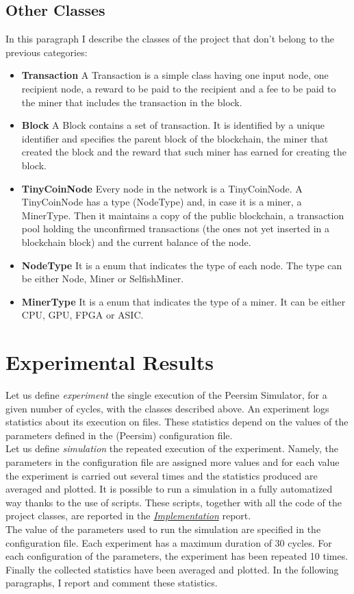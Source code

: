 \documentclass{article}
\begin{document}
\subsection{Other Classes} 
In this paragraph I describe the classes of the project that don't belong to the previous categories:
\begin{itemize}
\item \textbf{Transaction} A Transaction is a simple class having one input node, one recipient node, a reward to be paid to the recipient and a fee to be paid to the miner that includes the transaction in the block.
\item \textbf{Block} A Block contains a set of transaction. It is identified by a unique identifier and specifies the parent block of the blockchain, the miner that created the block and the reward that such miner has earned for creating the block.
\item \textbf{TinyCoinNode} Every node in the network is a TinyCoinNode. A TinyCoinNode has a type (NodeType) and, in case it is a miner, a MinerType. Then it maintains a copy of the public blockchain, a transaction pool holding the unconfirmed transactions (the ones not yet inserted in a blockchain block) and the current balance of the node.
\item \textbf{NodeType} It is a enum that indicates the type of each node. The type can be either Node, Miner or SelfishMiner.
\item \textbf{MinerType} It is a enum that indicates the type of a miner. It can be either CPU, GPU, FPGA or ASIC.
\end{itemize}


\section{Experimental Results}
Let us define \textit{experiment} the single execution of the Peersim Simulator, for a given number of cycles, with the classes described above. An experiment logs statistics about its execution on files. These statistics depend on the values of the parameters defined in the (Peersim) configuration file. \\
Let us define \textit{simulation} the repeated execution of the experiment. Namely, the parameters in the configuration file are assigned more values and for each value the experiment is carried out several times and the statistics produced are averaged and plotted. It is possible to run a simulation in a fully automatized way thanks to the use of scripts. These scripts, together with all the code of the project classes, are reported in the \href{https://github.com/Balzu/TinyCoin/blob/master/docs/implementation.pdf}{\textit{Implementation}} report. \\
The value of the parameters used to run the simulation are specified in the configuration file. Each experiment has a maximum duration of 30 cycles. For each configuration of the parameters, the experiment has been repeated 10 times. Finally the collected statistics have been averaged and plotted. In the following paragraphs, I report and comment these statistics.
\end{document}
